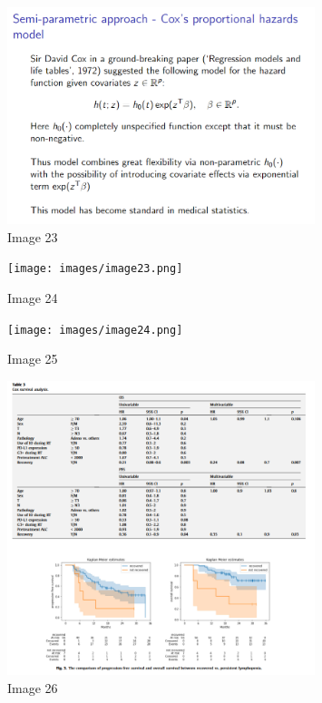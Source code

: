 \documentclass{article}%
\begin{document}
%


\begin{figure}[h!]%
\centering%
\includegraphics[width=0.8\textwidth]{images/image22.png}%
\caption{Image 23}%
\end{figure}

%


\begin{figure}[h!]%
\centering%
\texttt{[image: images/image23.png]}%
\caption{Image 24}%
\end{figure}

%


\begin{figure}[h!]%
\centering%
\texttt{[image: images/image24.png]}%
\caption{Image 25}%
\end{figure}

%


\begin{figure}[h!]%
\centering%
\includegraphics[width=0.8\textwidth]{images/image25.png}%
\caption{Image 26}%
\end{figure}
\end{document}
